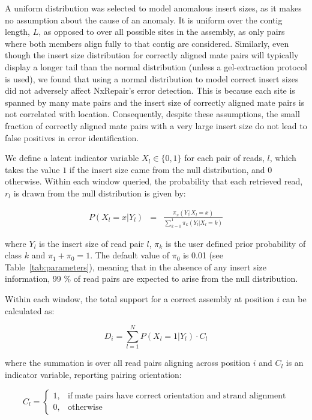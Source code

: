 \documentclass[fleqn,10pt]{wlpeerj}
\begin{document}
A uniform distribution was selected to model anomalous insert sizes, as it makes no assumption about the cause of an anomaly. It is uniform over the contig length, $L$, as opposed to over all possible sites in the assembly, as only pairs where both members align fully to that contig are considered. Similarly, even though the insert size distribution for correctly aligned mate pairs will typically display a longer tail than the normal distribution (unless a gel-extraction protocol is used), we found that using a normal distribution to model correct insert sizes did not adversely affect NxRepair's error detection. This is because each site is spanned by many mate pairs and the insert size of correctly aligned mate pairs is not correlated with location. Consequently, despite these assumptions, the small fraction of correctly aligned mate pairs with a very large insert size do not lead to false positives in error identification. 

We define a latent indicator variable $X_l\in\{0,1\}$ for each pair of reads, $l$, which takes the value $1$ if the insert size came from the null distribution, and $0$ otherwise. Within each window queried, the probability that each retrieved read, $r_l$ is drawn from the null distribution is given by:

\begin{eqnarray} P(X_l=x|Y_l)& =& \frac{\pi_x(Y_l|X_l=x)}{\sum_{k=0}^1 \pi_k(Y_l|X_l=k)}
\label{eq:posterior}  
\end{eqnarray}

where $Y_l$ is the insert size of read pair $l$, $\pi_k$ is the user defined prior probability of class $k$ and $\pi_1 + \pi_0 = 1$. The default value of $\pi_0$ is 0.01 (see Table~\ref{tab:parameters}), meaning that in the absence of any insert size information, 99 \% of read pairs are expected to arise from the null distribution.  

Within each window, the total support for a correct assembly at position $i$ can be calculated as:

\begin{equation}
D_i = \sum_{l=1}^N P(X_l=1|Y_l)\cdot C_l
\end{equation}

where the summation is over all read pairs aligning across position $i$ and $C_l$ is an indicator variable, reporting pairing orientation:

\begin{equation}
    C_l=
    \begin{cases}
      1, & \text{if}\ \text{mate pairs have correct orientation and strand alignment} \\
      0, & \text{otherwise}
    \end{cases}
  \label{eq:C}
  \end{equation}
\end{document}
